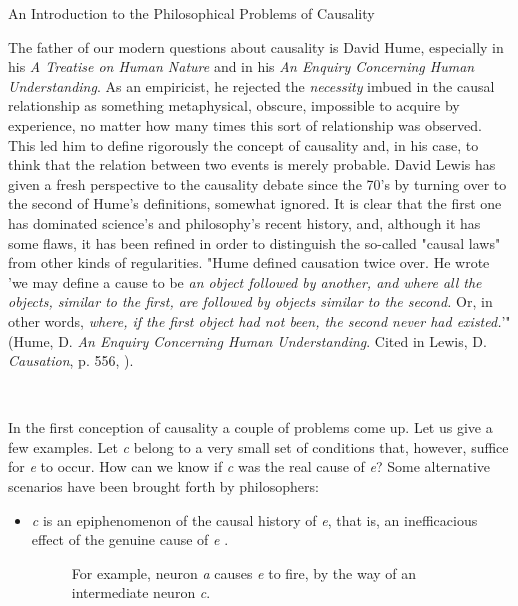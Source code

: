 \documentclass[12pt]{article}
\begin{document}
\begin{section}{An Introduction to the Philosophical Problems of Causality}

The father of our modern questions about causality is David Hume, especially in his \textit{A Treatise on Human Nature} and in his \textit{An Enquiry Concerning Human Understanding}. As an empiricist, he rejected the \textit{necessity} imbued in the causal relationship as something metaphysical, obscure, impossible to acquire by experience, no matter how many times this sort of relationship was observed. This led him to define rigorously the concept of causality and, in his case, to think that the relation between two events is merely probable. David Lewis has given a fresh perspective to the causality debate since the 70's by turning over to the second of Hume's definitions, somewhat ignored. It is clear that the first one has dominated science's and philosophy's recent history, and, although it has some flaws, it has been refined in order to distinguish the so-called "causal laws" from other kinds of regularities. "Hume defined causation twice over. He wrote 'we may define a cause to be \textit{an object followed by another, and where all the objects, similar to the first, are followed by objects similar to the second.} Or, in other words, \textit{where, if the first object had not been, the second never had existed.}'" (Hume, D. \textit{An Enquiry Concerning Human Understanding}. Cited in Lewis, D. \textit{Causation}, p. 556, \cite{lewis_causation_1973}).

\

In the first conception of causality a couple of problems come up. Let us give a few examples. Let \textit{c} belong to a very small set of conditions that, however, suffice for \textit{e} to occur. How can we know if \textit{c} was the real cause of \textit{e}? Some alternative scenarios have been brought forth by philosophers:

\begin{itemize}
\item \textit{c} is an epiphenomenon of the causal history of \textit{e}, that is, an inefficacious effect of the genuine cause of \textit{e} \cite{lewis_causation_1973}.

\begin{figure}[H]
\centering
{}
\caption{For example, neuron \textit{a} causes \textit{e} to fire, by the way of an intermediate neuron \textit{c}.\cite{collins_causation_2004}}
\end{figure}


\end{itemize}
\end{section}
\end{document}
